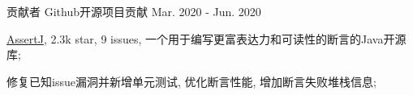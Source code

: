 \begin{cventries}
  \cventry
    {贡献者} %
    {Github开源项目贡献} %
    {} %
    {Mar. 2020 - Jun. 2020} %
    {
      \begin{cvitems} %
        \item {\href{https://github.com/assertj/assertj}{AssertJ}, 2.3k star, 9 issues, 一个用于编写更富表达力和可读性的断言的Java开源库;}
        \item {修复已知issue漏洞并新增单元测试, 优化断言性能, 增加断言失败堆栈信息;}
      \end{cvitems}
    }
\end{cventries}
